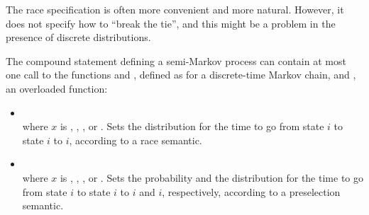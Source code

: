 {The race specification is often more convenient and more natural.
However, it does not specify how to ``break the tie'', and this might be
a problem in the presence of discrete distributions.

The compound statement defining a semi-Markov process can contain at most
one call to the functions  and , defined as
for a discrete-time Markov chain, and ,
an overloaded function:
\begin{itemize}
\item
{}\\
where $x$ is , , , or
.
Sets the distribution for the time to go from state $i$ to state
$i$ to $i$, according to a race semantic.
\item
{}\\
where $x$ is , , , or
.
Sets the probability and the distribution for the time to go from state
$i$ to state $i$ to $i$ and $i$,
respectively, according to a preselection semantic.
\end{itemize}
}

